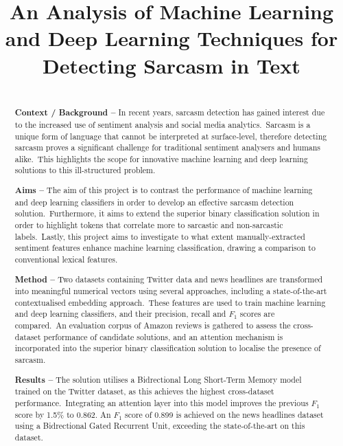 \documentclass[12pt,a4paper]{article}
\title{An Analysis of Machine Learning and Deep Learning Techniques for Detecting Sarcasm in Text}
\author{} %
\date{}
\begin{document}
	
\maketitle

\begin{abstract}
\\ \noindent \textbf{Context / Background --} 
In recent years, sarcasm detection has gained interest due to the increased use of sentiment analysis and social media analytics.\ Sarcasm is a unique form of language that cannot be interpreted at surface-level, therefore detecting sarcasm proves a significant challenge for traditional sentiment analysers and humans alike.\ This highlights the scope for innovative machine learning and deep learning solutions to this ill-structured problem.\vspace{5pt}

\noindent \textbf{Aims --} The aim of this project is to contrast the performance of machine learning and deep learning classifiers in order to develop an effective sarcasm detection solution.\ Furthermore, it aims to extend the superior binary classification solution in order to highlight tokens that correlate more to sarcastic and non-sarcastic labels.\ Lastly, this project aims to investigate to what extent manually-extracted sentiment features  enhance machine learning classification, drawing a comparison to conventional lexical features. \vspace{5pt}

\noindent \textbf{Method --} Two datasets containing Twitter data and news headlines are transformed into meaningful numerical vectors using several approaches, including a state-of-the-art contextualised embedding approach.\ These features are used to train machine learning and deep learning classifiers, and their precision, recall and $F_1$ scores are compared.\ An evaluation corpus of Amazon reviews is gathered to assess the cross-dataset performance of candidate solutions, and an attention mechanism is incorporated into the superior binary classification solution to localise the presence of sarcasm.\vspace{5pt}

\noindent \textbf{Results --} The solution utilises a Bidrectional Long Short-Term Memory model trained on the Twitter dataset, as this achieves the highest cross-dataset performance.\ Integrating an attention layer into this model improves the previous $F_1$ score by 1.5\% to 0.862. An $F_1$ score of 0.899 is achieved on the news headlines dataset using a Bidrectional Gated Recurrent Unit, exceeding the state-of-the-art on this dataset.\vspace{5pt}


\end{abstract}
\end{document}
